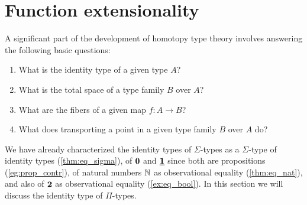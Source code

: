 \chapter{Function extensionality}

A significant part of the development of homotopy type theory involves answering the following basic questions:
\begin{enumerate}
\item What is the identity type of a given type $A$?
\item What is the total space of a type family $B$ over $A$?
\item What are the fibers of a given map $f:A\to B$?
\item What does transporting a point in a given type family $B$ over $A$ do?
\end{enumerate}
We have already characterized the identity types of $\Sigma$-types as a $\Sigma$-type of identity types (\cref{thm:eq_sigma}), of $\mathbf{0}$ and $\underline{\mathbf{1}}$ since both are propositions (\cref{eg:prop_contr}), of natural numbers $\mathbb{N}$ as observational equality (\cref{thm:eq_nat}), and also of $\mathbf{2}$ as observational equality (\cref{ex:eq_bool}). In this section we will discuss the identity type of $\Pi$-types.

